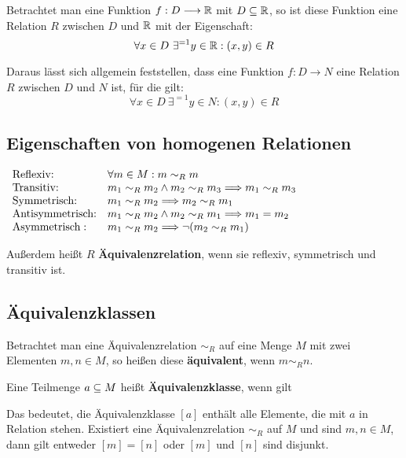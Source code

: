 \documentclass[11pt]{article}
\begin{document}
Betrachtet man eine Funktion $f : D \longrightarrow \mathbb{R}$ mit $D \subseteq \mathbb{R}$, so ist diese Funktion eine Relation $R$ zwischen
$D$ und $\mathbb{R}$ mit der Eigenschaft:
\[
  \forall x \in D~\exists^{=1} y \in \mathbb{R}: (x, y) \in R
\]

Daraus lässt sich allgemein feststellen, dass eine Funktion $f : D \longrightarrow N$ eine Relation $R$ zwischen $D$ und
$N$ ist, für die gilt:
\[
  \forall x \in D~\exists^{=1} y \in N: (x, y) \in R
\]

\subsection{Eigenschaften von homogenen Relationen}
$
  \begin{array}{l l}
    \text{Reflexiv:}        & \forall m \in M: m \sim_R m                                        \\
    \text{Transitiv:}       & m_1 \sim_R m_2 \land m_2 \sim_R m_3 \Longrightarrow m_1 \sim_R m_3 \\
    \text{Symmetrisch:}     & m_1 \sim_R m_2 \Longrightarrow m_2 \sim_R m_1                      \\
    \text{Antisymmetrisch:} & m_1 \sim_R m_2 \land m_2 \sim_R m_1 \Longrightarrow m_1 = m_2      \\
    \text{Asymmetrisch}:    & m_1 \sim_R m_2 \Longrightarrow \lnot(m_2 \sim_R m_1)               \\
  \end{array}
$

Außerdem heißt $R$ \textbf{Äquivalenzrelation}, wenn sie reflexiv, symmetrisch und transitiv ist.

\subsection{Äquivalenzklassen}
Betrachtet man eine Äquivalenzrelation $\sim_R$ auf eine Menge $M$ mit zwei Elementen $m, n \in M$, so heißen diese
\textbf{äquivalent}, wenn $m \sim_R n$.

Eine Teilmenge $a \subseteq M$ heißt \textbf{Äquivalenzklasse}, wenn gilt
\ul{
}

Das bedeutet, die Äquivalenzklasse $[a]$ enthält alle Elemente, die mit $a$ in Relation stehen.
Existiert eine Äquivalenzrelation $\sim_R$ auf $M$ und sind $m,n \in M$, dann gilt entweder $[m] = [n]$ oder $[m]$ und
$[n]$ sind disjunkt.
\end{document}
